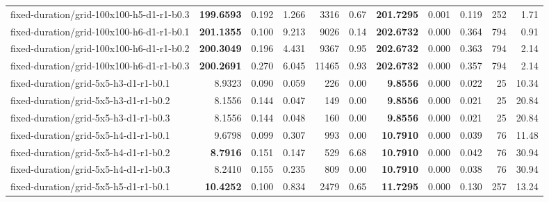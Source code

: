 \documentclass[10pt]{article}
\begin{document}
\begin{tabular}{p{65mm}rrrrrrrrrr}
fixed-\allowbreak duration/\allowbreak grid-\allowbreak 100x100-\allowbreak h5-\allowbreak d1-\allowbreak r1-\allowbreak b0.3 & \textbf{199.6593} & 0.192 & 1.266 & 3316 & 0.67 & \textbf{201.7295} & 0.001 & 0.119 & 252 & 1.71 \\
fixed-\allowbreak duration/\allowbreak grid-\allowbreak 100x100-\allowbreak h6-\allowbreak d1-\allowbreak r1-\allowbreak b0.1 & \textbf{201.1355} & 0.100 & 9.213 & 9026 & 0.14 & \textbf{202.6732} & 0.000 & 0.364 & 794 & 0.91 \\
fixed-\allowbreak duration/\allowbreak grid-\allowbreak 100x100-\allowbreak h6-\allowbreak d1-\allowbreak r1-\allowbreak b0.2 & \textbf{200.3049} & 0.196 & 4.431 & 9367 & 0.95 & \textbf{202.6732} & 0.000 & 0.363 & 794 & 2.14 \\
fixed-\allowbreak duration/\allowbreak grid-\allowbreak 100x100-\allowbreak h6-\allowbreak d1-\allowbreak r1-\allowbreak b0.3 & \textbf{200.2691} & 0.270 & 6.045 & 11465 & 0.93 & \textbf{202.6732} & 0.000 & 0.357 & 794 & 2.14 \\
fixed-\allowbreak duration/\allowbreak grid-\allowbreak 5x5-\allowbreak h3-\allowbreak d1-\allowbreak r1-\allowbreak b0.1 & 8.9323 & 0.090 & 0.059 & 226 & 0.00 & \textbf{9.8556} & 0.000 & 0.022 & 25 & 10.34 \\
fixed-\allowbreak duration/\allowbreak grid-\allowbreak 5x5-\allowbreak h3-\allowbreak d1-\allowbreak r1-\allowbreak b0.2 & 8.1556 & 0.144 & 0.047 & 149 & 0.00 & \textbf{9.8556} & 0.000 & 0.021 & 25 & 20.84 \\
fixed-\allowbreak duration/\allowbreak grid-\allowbreak 5x5-\allowbreak h3-\allowbreak d1-\allowbreak r1-\allowbreak b0.3 & 8.1556 & 0.144 & 0.048 & 160 & 0.00 & \textbf{9.8556} & 0.000 & 0.021 & 25 & 20.84 \\
fixed-\allowbreak duration/\allowbreak grid-\allowbreak 5x5-\allowbreak h4-\allowbreak d1-\allowbreak r1-\allowbreak b0.1 & 9.6798 & 0.099 & 0.307 & 993 & 0.00 & \textbf{10.7910} & 0.000 & 0.039 & 76 & 11.48 \\
fixed-\allowbreak duration/\allowbreak grid-\allowbreak 5x5-\allowbreak h4-\allowbreak d1-\allowbreak r1-\allowbreak b0.2 & \textbf{8.7916} & 0.151 & 0.147 & 529 & 6.68 & \textbf{10.7910} & 0.000 & 0.042 & 76 & 30.94 \\
fixed-\allowbreak duration/\allowbreak grid-\allowbreak 5x5-\allowbreak h4-\allowbreak d1-\allowbreak r1-\allowbreak b0.3 & 8.2410 & 0.155 & 0.235 & 809 & 0.00 & \textbf{10.7910} & 0.000 & 0.038 & 76 & 30.94 \\
fixed-\allowbreak duration/\allowbreak grid-\allowbreak 5x5-\allowbreak h5-\allowbreak d1-\allowbreak r1-\allowbreak b0.1 & \textbf{10.4252} & 0.100 & 0.834 & 2479 & 0.65 & \textbf{11.7295} & 0.000 & 0.130 & 257 & 13.24 \\

\end{tabular}
\end{document}
